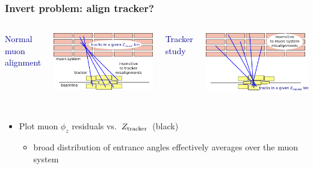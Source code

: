 \documentclass[compress]{beamer}
\begin{document}
\begin{frame}
\frametitle{Invert problem: align tracker?}

\vspace{0.25 cm}
\begin{columns}
\textcolor{darkblue}{Normal muon alignment}

\includegraphics[width=\linewidth]{globalMuons_vsmuon.png}

\textcolor{darkblue}{Tracker study}

\includegraphics[width=\linewidth]{globalMuons_vstracker.png}
\end{columns}

\vspace{0.1 cm}
\begin{columns}
\begin{itemize}\setlength{\itemsep}{0.25 cm}
\item Plot muon $\phi_z$ residuals vs.\ \mbox{$Z_{\mbox{\scriptsize tracker}}$ (black)\hspace{-1 cm}}
\begin{itemize}
\item broad distribution of entrance angles effectively averages over
  the muon system
\end{itemize}


\end{itemize}
\end{columns}
\end{frame}
\end{document}
